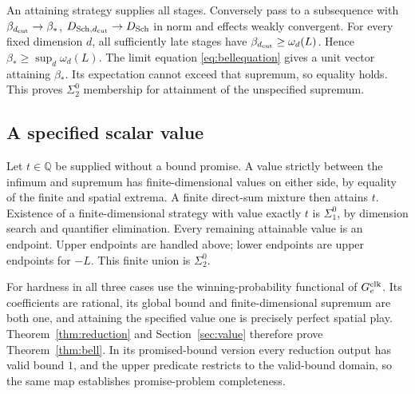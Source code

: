 An attaining strategy supplies all stages. Conversely pass to a subsequence with $\beta_{d_{\rm cut}}\to\beta_*$, $D_{{\rm Sch},{d_{\rm cut}}}\to D_{\rm Sch}$ in norm and effects weakly convergent. For every fixed dimension $d$, all sufficiently late stages have $\beta_{d_{\rm cut}}\geq\omega_d(L)$. Hence $\beta_*\geq\sup_d\omega_d(L)$. The limit equation \eqref{eq:bellequation} gives a unit vector attaining $\beta_*$. Its expectation cannot exceed that supremum, so equality holds. This proves $\Sigma^0_2$ membership for attainment of the unspecified supremum.

\subsection{A specified scalar value}
Let $t\in\mathbb Q$ be supplied without a bound promise. A value strictly between the infimum and supremum has finite-dimensional values on either side, by equality of the finite and spatial extrema. A finite direct-sum mixture then attains $t$. Existence of a finite-dimensional strategy with value exactly $t$ is $\Sigma^0_1$, by dimension search and quantifier elimination. Every remaining attainable value is an endpoint. Upper endpoints are handled above; lower endpoints are upper endpoints for $-L$. This finite union is $\Sigma^0_2$.

For hardness in all three cases use the winning-probability functional of $G^{\rm clk}_e$. Its coefficients are rational, its global bound and finite-dimensional supremum are both one, and attaining the specified value one is precisely perfect spatial play. Theorem~\ref{thm:reduction} and Section~\ref{sec:value} therefore prove Theorem~\ref{thm:bell}. In its promised-bound version every reduction output has valid bound $1$, and the upper predicate restricts to the valid-bound domain, so the same map establishes promise-problem completeness.
